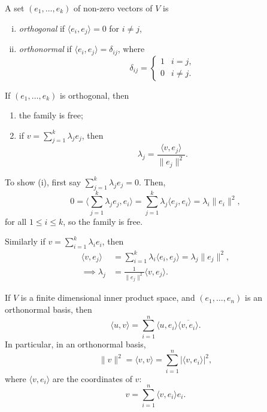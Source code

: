 \documentclass[12pt]{article}
\begin{document}
\begin{definition}
	A set $(e_1, \ldots, e_k)$ of non-zero vectors of $V$ is
	\begin{enumerate}[(i)]
		\item \textit{orthogonal} if $\langle e_i, e_j \rangle = 0$ for $i \neq j$,
		\item \textit{orthonormal} if $\langle e_i, e_j \rangle = \delta_{ij}$, where
			\[
			\delta_{ij} =
			\begin{cases}
				1 & i = j, \\
				0 & i \neq j.
			\end{cases}
			\]
	\end{enumerate}
\end{definition}

\begin{lemma}
	If $(e_1, \ldots, e_k)$ is orthogonal, then
	\begin{enumerate}[\normalfont(i)]
		\item the family is free;
		\item if $v = \sum_{j = 1}^{k} \lambda_j e_j$, then
			\[
			\lambda_j = \frac{\langle v, e_j \rangle}{\|e_j\|^2}
			.\]
	\end{enumerate}
\end{lemma}

\begin{proofbox}
	To show (i), first say $\sum_{j = 1}^{k} \lambda_j e_j = 0$. Then,
	\[
	0 = \biggl\langle \sum_{j = 1}^{k} \lambda_j e_j, e_i \biggr\rangle = \sum_{j = 1}^{k} \lambda_j \langle e_j, e_i \rangle = \lambda_i \|e_i\|^2
	,\]
	for all $1 \leq i \leq k$, so the family is free.

	Similarly if $v = \sum_{i = 1}^{k} \lambda_i e_i$, then
	\begin{align*}
		\langle v, e_j \rangle &= \sum_{i = 1}^{k} \lambda_i \langle e_i, e_j \rangle = \lambda_j \|e_j\|^2, \\
		\implies \lambda_j &= \frac{1}{\|e_j\|^2} \langle v, e_j \rangle.
	\end{align*}
\end{proofbox}

\begin{lemma}
	If $V$ is a finite dimensional inner product space, and $(e_1, \ldots, e_n)$ is an orthonormal basis, then
	\[
	\langle u, v \rangle = \sum_{i = 1}^{n} \langle u, e_i \rangle \overline{\langle v, e_i \rangle}
	.\]
	In particular, in an orthonormal basis,
	\[
	\|v\|^2 = \langle v, v \rangle = \sum_{i = 1}^{n} |\langle v, e_i \rangle|^2
	,\]
	where $\langle v, e_i \rangle$ are the coordinates of $v$:
	\[
	v = \sum_{i = 1}^{n} \langle v, e_i \rangle e_i
	.\]
\end{lemma}
\end{document}
